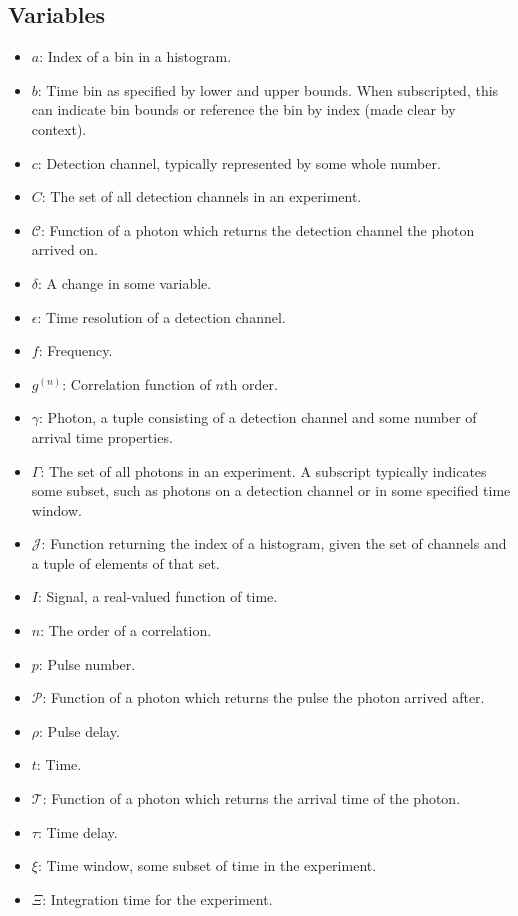 \documentclass{article}
\newcommand{\gn}[1]{\ensuremath{g^{(#1)}}}
\newcommand{\channel}{\ensuremath{c}}
\newcommand{\channels}{\ensuremath{C}}
\newcommand{\Channel}{\ensuremath{\mathcal{C}}}
\newcommand{\Time}{\ensuremath{\mathcal{T}}}
\newcommand{\photon}{\ensuremath{\gamma}}
\newcommand{\photons}{\ensuremath{\Gamma}}
\newcommand{\Pulse}{\ensuremath{\mathcal{P}}}
\newcommand{\integrationtime}{\ensuremath{\Xi}}
\newcommand{\timewindow}{\ensuremath{\xi}}
\newcommand{\resolution}{\ensuremath{\epsilon}}
\newcommand{\Index}{\ensuremath{\mathcal{J}}}
\newcommand{\Histogram}{\ensuremath{\mathcal{H}}}
\begin{document}
\begin{appendix}
\subsection{Variables}
\begin{itemize}
\item $a$: Index of a bin in a histogram.
\item $b$: Time bin as specified by lower and upper bounds. When subscripted, this can indicate bin bounds or reference the bin by index (made clear by context).
\item $\channel$: Detection channel, typically represented by some whole number.
\item $\channels$: The set of all detection channels in an experiment.
\item $\Channel$: Function of a photon which returns the detection channel the photon arrived on.
\item $\delta$: A change in some variable.
\item $\resolution$: Time resolution of a detection channel.
\item $f$: Frequency.
\item $\gn{n}$: Correlation function of $n$th order.
\item $\photon$: Photon, a tuple consisting of a detection channel and some number of arrival time properties.
\item $\photons$: The set of all photons in an experiment. A subscript typically indicates some subset, such as photons on a detection channel or in some specified time window.
\item $\Index$: Function returning the index of a histogram, given the set of channels and a tuple of elements of that set.
\item $I$: Signal, a real-valued function of time.
\item $n$: The order of a correlation.
\item $p$: Pulse number.
\item $\Pulse$: Function of a photon which returns the pulse the photon arrived after.
\item $\rho$: Pulse delay.
\item $t$: Time.
\item $\Time$: Function of a photon which returns the arrival time of the photon.
\item $\tau$:  Time delay.
\item $\timewindow$: Time window, some subset of time in the experiment.
\item $\integrationtime$: Integration time for the experiment.
\end{itemize}


\end{appendix}
\end{document}
